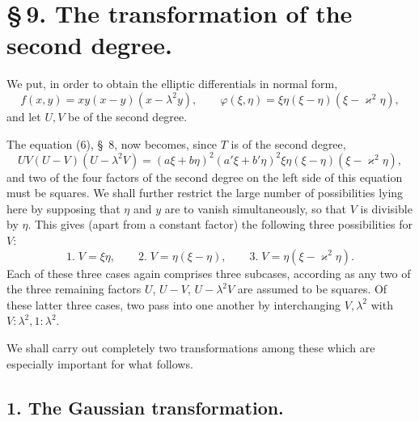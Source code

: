 \documentclass[11pt]{article}
\begin{document}
\section*{\S\,9. The transformation of the second degree.}

We put, in order to obtain the elliptic differentials in normal form,
\[
f(x,y)=xy(x-y)(x-\lambda^2y),\qquad
\varphi(\xi,\eta)=\xi\eta(\xi-\eta)(\xi-\varkappa^2\eta),
\]
and let $U,V$ be of the second degree.

The equation (6), \S~8, now becomes, since $T$ is of the second degree,
\begin{equation}
UV(U-V)(U-\lambda^2V)
=(a\xi+b\eta)^2(a'\xi+b'\eta)^2\xi\eta(\xi-\eta)(\xi-\varkappa^2\eta),
\tag{1}
\end{equation}
and two of the four factors of the second degree on the left side of this equation must be squares. We shall further restrict the large number of possibilities lying here by supposing that $\eta$ and $y$ are to vanish simultaneously, so that $V$ is divisible by $\eta$. This gives (apart from a constant factor) the following three possibilities for $V$:
\[
1.\; V=\xi\eta,\qquad
2.\; V=\eta(\xi-\eta),\qquad
3.\; V=\eta(\xi-\varkappa^2\eta).
\]
Each of these three cases again comprises three subcases, according as any two of the three remaining factors $U$, $U-V$, $U-\lambda^2V$ are assumed to be squares. Of these latter three cases, two pass into one another by interchanging $V,\lambda^2$ with $V:\lambda^2,1:\lambda^2$.

We shall carry out completely two transformations among these which are especially important for what follows.

\subsection*{1. The Gaussian transformation.}
\end{document}
